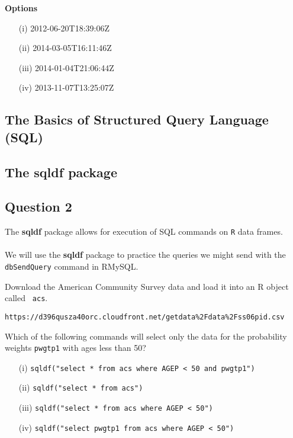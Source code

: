 \documentclass[12pt]{article}
\begin{document}
\noindent \textbf{Options} \\
\begin{itemize}
\item[(i)] 2012-06-20T18:39:06Z
\item[(ii)] 2014-03-05T16:11:46Z
\item[(iii)] 2014-01-04T21:06:44Z
\item[(iv)] 2013-11-07T13:25:07Z
\end{itemize}
\newpage
\subsection*{The Basics of Structured Query Language (SQL)}
\newpage
\subsection*{The sqldf package}
\newpage
\subsection*{Question 2}
The \textbf{sqldf} package allows for execution of SQL commands on \texttt{R} data frames. \\\\ \noindent We will use the \textbf{sqldf} package to practice the queries we might send with the \texttt{dbSendQuery} command in RMySQL. 

\bigskip
\noindent Download the American Community Survey data and load it into an R object called
\texttt{ acs}.

\begin{verbatim}
https://d396qusza40orc.cloudfront.net/getdata%2Fdata%2Fss06pid.csv 
\end{verbatim}

\noindent Which of the following commands will select only the data for the probability weights \texttt{pwgtp1} with ages less than 50?
\begin{itemize}
\item[(i)] \texttt{sqldf("select * from acs where AGEP < 50 and pwgtp1")}
\item[(ii)] \texttt{sqldf("select * from acs")}
\item[(iii)] \texttt{sqldf("select * from acs where AGEP < 50")}
\item[(iv)] \texttt{sqldf("select pwgtp1 from acs where AGEP < 50")}
\end{itemize}
\end{document}
